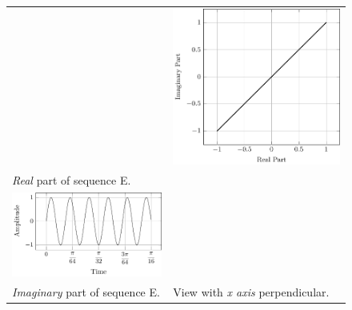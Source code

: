 \documentclass[../../course]{subfiles}
\begin{document}
\begin{figure} [H]
\begin{NiceTabularX} {\textwidth} {
            *{2}{>{\centering\arraybackslash}X}
        }
        &

         {
             {
                \includegraphics[height = \textheight] {tikzpics/plotFrontViewComplexE.pdf}
            }
        }

        \\

         {\emph{Real} part of sequence E.}
        \label{plt:realCmplxE}

        &
        \\

         {
             {
                \includegraphics[height = \textheight] {tikzpics/plotShortX1.pdf}
            }
        }

        &
        \\

         {\emph{Imaginary} part of sequence E.}
        \label{plt:imagCmplxE}

        &

         {View with \emph{x axis} perpendicular.}
        \label{plt:frontViewCmplxE}

        \\

    \end{NiceTabularX}

\end{figure}
\end{document}
